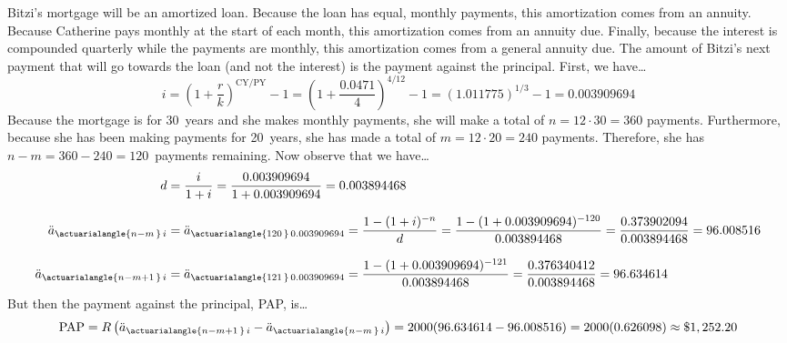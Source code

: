 \documentclass[11pt,letterpaper]{article}
\begin{document}
\sol Bitzi's mortgage will be an amortized loan. Because the loan has equal, monthly payments, this amortization comes from an annuity. Because Catherine pays monthly at the start of each month, this amortization comes from an annuity due. Finally, because the interest is compounded quarterly while the payments are monthly, this amortization comes from a general annuity due. The amount of Bitzi's next payment that will go towards the loan (and not the interest) is the payment against the principal. First, we have\dots
	\[
	i= \left(1 + \dfrac{r}{k} \right)^{\text{CY}/\text{PY}} - 1= \left(1 + \dfrac{0.0471}{4} \right)^{\text{4}/\text{12}} - 1= (1.011775)^{1/3} - 1= 0.003909694
	\]
Because the mortgage is for 30~years and she makes monthly payments, she will make a total of $n= 12 \cdot 30= 360$ payments. Furthermore, because she has been making payments for 20~years, she has made a total of $m= 12 \cdot 20= 240$ payments. Therefore, she has $n - m= 360 - 240= 120$~payments remaining. Now observe that we have\dots
	\[
	\begin{aligned}
	d&= \dfrac{i}{1 + i}= \dfrac{0.003909694}{1 + 0.003909694}= 0.003894468 \\[0.3cm]
	\ddot{a}_{\actuarialangle{n - m\,}\, i}&= \ddot{a}_{\actuarialangle{120\,}\, 0.003909694}= \dfrac{1 - (1+ i)^{-n}}{d}= \dfrac{1 - (1 + 0.003909694)^{-120}}{0.003894468}= \dfrac{0.373902094}{0.003894468}= 96.008516 \\[0.3cm]
	\ddot{a}_{\actuarialangle{n - m + 1\,}\, i}&=\ddot{a}_{\actuarialangle{121\,}\, 0.003909694}= \dfrac{1 - (1 + 0.003909694)^{-121}}{0.003894468}= \dfrac{0.376340412}{0.003894468}= 96.634614
	\end{aligned}
	\]
But then the payment against the principal, PAP, is\dots
	\[
	\text{PAP}= R \left( \ddot{a}_{\actuarialangle{n - m + 1\,}\, i} - \ddot{a}_{\actuarialangle{n - m\,}\, i} \right)= 2000 (96.634614 - 96.008516)= 2000(0.626098) \approx \$1,252.20
	\]
\end{document}
